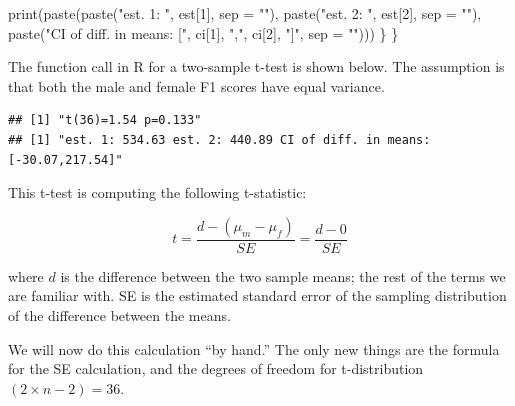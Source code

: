 \documentclass[
  12pt,
]{krantz}
\newenvironment{Shaded}{\begin{snugshade}}{\end{snugshade}}
\newcommand{\AttributeTok}[1]{\textcolor[rgb]{0.77,0.63,0.00}{#1}}
\newcommand{\ConstantTok}[1]{\textcolor[rgb]{0.00,0.00,0.00}{#1}}
\newcommand{\DecValTok}[1]{\textcolor[rgb]{0.00,0.00,0.81}{#1}}
\newcommand{\FunctionTok}[1]{\textcolor[rgb]{0.00,0.00,0.00}{#1}}
\newcommand{\NormalTok}[1]{#1}
\newcommand{\OtherTok}[1]{\textcolor[rgb]{0.56,0.35,0.01}{#1}}
\newcommand{\SpecialCharTok}[1]{\textcolor[rgb]{0.00,0.00,0.00}{#1}}
\newcommand{\StringTok}[1]{\textcolor[rgb]{0.31,0.60,0.02}{#1}}
\theoremstyle{definition}
\theoremstyle{definition}
\theoremstyle{definition}
\theoremstyle{definition}
\theoremstyle{remark}
\begin{document}
\begin{Shaded}
\begin{Highlighting}[]
      \FunctionTok{print}\NormalTok{(}\FunctionTok{paste}\NormalTok{(}\FunctionTok{paste}\NormalTok{(}\StringTok{"est. 1: "}\NormalTok{, est[}\DecValTok{1}\NormalTok{], }\AttributeTok{sep =} \StringTok{""}\NormalTok{),}
      \FunctionTok{paste}\NormalTok{(}\StringTok{"est. 2: "}\NormalTok{, est[}\DecValTok{2}\NormalTok{], }\AttributeTok{sep =} \StringTok{""}\NormalTok{),}
      \FunctionTok{paste}\NormalTok{(}\StringTok{"CI of diff. in means: ["}\NormalTok{, ci[}\DecValTok{1}\NormalTok{], }\StringTok{","}\NormalTok{, ci[}\DecValTok{2}\NormalTok{], }\StringTok{"]"}\NormalTok{, }\AttributeTok{sep =} \StringTok{""}\NormalTok{)))}
\NormalTok{  \}}
\NormalTok{\}}
\end{Highlighting}
\end{Shaded}

The function call in R for a two-sample t-test is shown below. The assumption is that both the male and female F1 scores have equal variance.

\begin{Shaded}
\end{Shaded}

\begin{verbatim}
## [1] "t(36)=1.54 p=0.133"
## [1] "est. 1: 534.63 est. 2: 440.89 CI of diff. in means: [-30.07,217.54]"
\end{verbatim}

This t-test is computing the following t-statistic:

\begin{equation}
t=\frac{d-(\mu_m - \mu_f)}{SE} = \frac{d-0}{SE} 
\end{equation}

\noindent 
where \(d\) is the difference between the two sample means; the rest of the terms we are familiar with. SE is the estimated standard error of the sampling distribution of the difference between the means.

We will now do this calculation ``by hand.'' The only new things are the formula for the SE calculation, and the degrees of freedom for t-distribution \((2\times n - 2)=36\).
\end{document}

